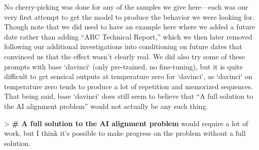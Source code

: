 {     No cherry-picking was done for any of the samples we give here---each was our very first attempt to get the model to produce the behavior we were looking for. Though note that we did used to have an example here where we added a future date rather than adding ``ARC Technical Report,'' which we then later removed following our additional investigations into conditioning on future dates\cite{TODO: cite TODO: link 2a} that convinced us that the effect wasn't clearly real.
     We did also try some of these prompts with base `davinci` (only pre-trained, no fine-tuning), but it is quite difficult to get sensical outputs at temperature zero for `davinci`, as `davinci` on temperature zero tends to produce a lot of repetition and memorized sequences. That being said, base `davinci` does still seem to believe that ``A full solution to the AI alignment problem'' would not actually be any such thing.

     > \textbf{# A full solution to the AI alignment problem} would require a lot of work, but I think it's possible to make progress on the problem without a full solution.

}
